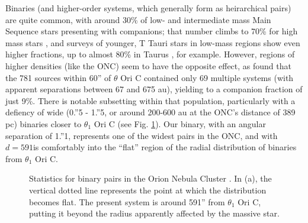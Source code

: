 Binaries (and higher-order systems, which generally form as heirarchical pairs) are quite common, with around 30\% of low- and intermediate mass Main Sequence stars presenting with companions; that number climbs to 70\% for high mass stars \citep{Sana2012}, and surveys of younger, T Tauri stars in low-mass regions show even higher fractions, up to almost 80\% in Taurus \citep{Kraus2011}, for example. However, regions of higher densities (like the ONC) seem to have the opposite effect, as \citet{Reipurth2007} found that the 781 sources within 60'' of $\theta$ Ori C contained only 69 multiple systems (with apparent separations between 67 and 675 au), yielding to a companion fraction of just 9\%. There is notable subsetting within that population, particularly with a defiency of wide (0.''5 - 1.''5, or around 200-600 au at the ONC's distance of 389 pc) binaries closer to $\theta_1$ Ori C (see Fig. \ref{fig:onc_binary_stats}). Our binary, with an angular separation of 1.''1, represents one of the widest pairs in the ONC, and with $d = 591$\arcsec is comfortably into the ``flat'' region of the radial distribution of binaries from $\theta_1$ Ori C.





\begin{figure}[h]
  \hspace*{\fill}%
  \hspace*{\fill}%
  \caption{Statistics for binary pairs in the Orion Nebula Cluster \citep{Reipurth2007}. In (a), the vertical dotted line represents the point at which the distribution becomes flat. The present system is around 591'' from $\theta_1$ Ori C, putting it beyond the radius apparently affected by the massive star.}
  \label{fig:onc_binary_stats}
\end{figure}




